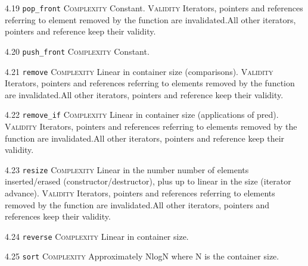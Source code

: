 \noindent\textcolor{cgreen}{4.19 \texttt{pop\_front}} \textsc{Complexity} Constant. \textsc{Validity} Iterators, pointers and references referring to element removed by the function are invalidated.All other iterators, pointers and reference keep their validity.\vspace{0.5em}

\noindent\textcolor{cgreen}{4.20 \texttt{push\_front}} \textsc{Complexity} Constant. \vspace{0.5em}

\noindent\textcolor{corange}{4.21 \texttt{remove}} \textsc{Complexity} Linear in container size (comparisons). \textsc{Validity} Iterators, pointers and references referring to elements removed by the function are invalidated.All other iterators, pointers and reference keep their validity.\vspace{0.5em}

\noindent\textcolor{corange}{4.22 \texttt{remove\_if}} \textsc{Complexity} Linear in container size (applications of pred). \textsc{Validity} Iterators, pointers and references referring to elements removed by the function are invalidated.All other iterators, pointers and reference keep their validity.\vspace{0.5em}

\noindent\textcolor{corange}{4.23 \texttt{resize}} \textsc{Complexity} Linear in the number number of elements inserted/erased (constructor/destructor), plus up to linear in the size (iterator advance). \textsc{Validity} Iterators, pointers and references referring to elements removed by the function are invalidated.All other iterators, pointers and references keep their validity.\vspace{0.5em}

\noindent\textcolor{corange}{4.24 \texttt{reverse}} \textsc{Complexity} Linear in container size. \vspace{0.5em}

\noindent\textcolor{cred}{4.25 \texttt{sort}} \textsc{Complexity} Approximately NlogN where N is the container size. \vspace{0.5em}


